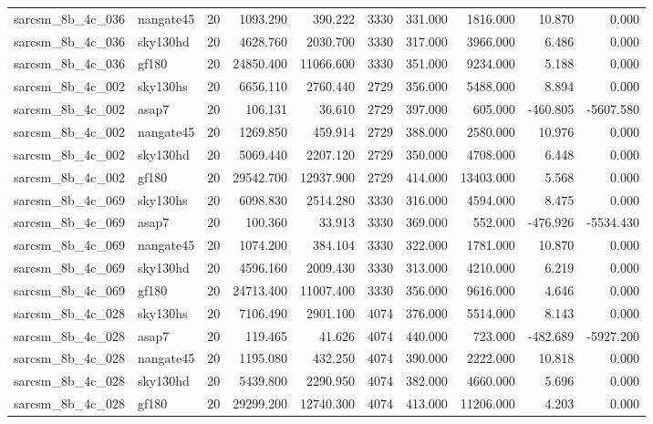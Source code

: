 \begin{tabular}{llrrrrrrrr}
sarcsm\_8b\_4c\_036 & nangate45 & 20 & 1093.290 & 390.222 & 3330 & 331.000 & 1816.000 & 10.870 & 0.000 \\
sarcsm\_8b\_4c\_036 & sky130hd & 20 & 4628.760 & 2030.700 & 3330 & 317.000 & 3966.000 & 6.486 & 0.000 \\
sarcsm\_8b\_4c\_036 & gf180 & 20 & 24850.400 & 11066.600 & 3330 & 351.000 & 9234.000 & 5.188 & 0.000 \\
sarcsm\_8b\_4c\_002 & sky130hs & 20 & 6656.110 & 2760.440 & 2729 & 356.000 & 5488.000 & 8.894 & 0.000 \\
sarcsm\_8b\_4c\_002 & asap7 & 20 & 106.131 & 36.610 & 2729 & 397.000 & 605.000 & -460.805 & -5607.580 \\
sarcsm\_8b\_4c\_002 & nangate45 & 20 & 1269.850 & 459.914 & 2729 & 388.000 & 2580.000 & 10.976 & 0.000 \\
sarcsm\_8b\_4c\_002 & sky130hd & 20 & 5069.440 & 2207.120 & 2729 & 350.000 & 4708.000 & 6.448 & 0.000 \\
sarcsm\_8b\_4c\_002 & gf180 & 20 & 29542.700 & 12937.900 & 2729 & 414.000 & 13403.000 & 5.568 & 0.000 \\
sarcsm\_8b\_4c\_069 & sky130hs & 20 & 6098.830 & 2514.280 & 3330 & 316.000 & 4594.000 & 8.475 & 0.000 \\
sarcsm\_8b\_4c\_069 & asap7 & 20 & 100.360 & 33.913 & 3330 & 369.000 & 552.000 & -476.926 & -5534.430 \\
sarcsm\_8b\_4c\_069 & nangate45 & 20 & 1074.200 & 384.104 & 3330 & 322.000 & 1781.000 & 10.870 & 0.000 \\
sarcsm\_8b\_4c\_069 & sky130hd & 20 & 4596.160 & 2009.430 & 3330 & 313.000 & 4210.000 & 6.219 & 0.000 \\
sarcsm\_8b\_4c\_069 & gf180 & 20 & 24713.400 & 11007.400 & 3330 & 356.000 & 9616.000 & 4.646 & 0.000 \\
sarcsm\_8b\_4c\_028 & sky130hs & 20 & 7106.490 & 2901.100 & 4074 & 376.000 & 5514.000 & 8.143 & 0.000 \\
sarcsm\_8b\_4c\_028 & asap7 & 20 & 119.465 & 41.626 & 4074 & 440.000 & 723.000 & -482.689 & -5927.200 \\
sarcsm\_8b\_4c\_028 & nangate45 & 20 & 1195.080 & 432.250 & 4074 & 390.000 & 2222.000 & 10.818 & 0.000 \\
sarcsm\_8b\_4c\_028 & sky130hd & 20 & 5439.800 & 2290.950 & 4074 & 382.000 & 4660.000 & 5.696 & 0.000 \\
sarcsm\_8b\_4c\_028 & gf180 & 20 & 29299.200 & 12740.300 & 4074 & 413.000 & 11206.000 & 4.203 & 0.000 \\

\end{tabular}
